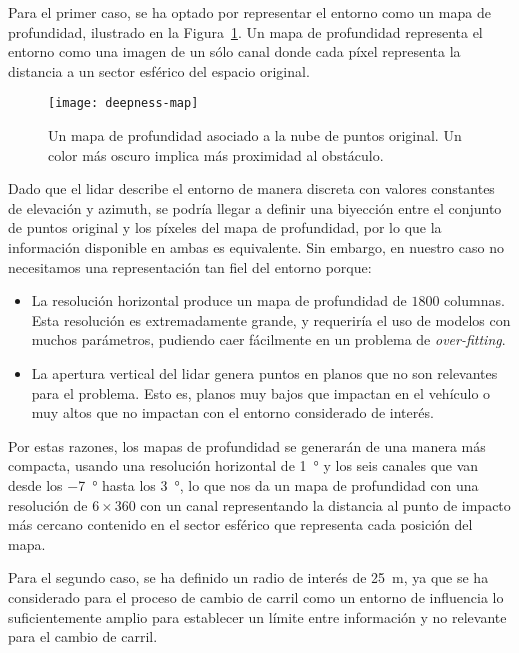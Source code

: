 Para el primer caso, se ha optado por representar el entorno como un mapa de profundidad, ilustrado en la Figura~\ref{fig:deepmap-example}. Un mapa de profundidad representa el entorno como una imagen de un sólo canal donde cada píxel representa la distancia a un sector esférico del espacio original.

\begin{figure}
	\centering
	\texttt{[image: deepness-map]}
	\caption[Mapa de profundidad de ejemplo]{Un mapa de profundidad asociado a la nube de puntos original. Un color más oscuro implica más proximidad al obstáculo.}
	\label{fig:deepmap-example}
\end{figure}

Dado que el \acrshort{lidar} describe el entorno de manera discreta con valores constantes de elevación y azimuth, se podría llegar a definir una biyección entre el conjunto de puntos original y los píxeles del mapa de profundidad, por lo que la información disponible en ambas es equivalente. Sin embargo, en nuestro caso no necesitamos una representación tan fiel del entorno porque:

\begin{itemize}
	\item La resolución horizontal produce un mapa de profundidad de $1800$ columnas. Esta resolución es extremadamente grande, y requeriría el uso de modelos con muchos parámetros, pudiendo caer fácilmente en un problema de \textit{over-fitting}.
	\item La apertura vertical del \acrshort{lidar} genera puntos en planos que no son relevantes para el problema. Esto es, planos muy bajos que impactan en el vehículo o muy altos que no impactan con el entorno considerado de interés.
\end{itemize}

Por estas razones, los mapas de profundidad se generarán de una manera más compacta, usando una resolución horizontal de \SI{1}{\degree} y los seis canales que van desde los \SI{-7}{\degree} hasta los \SI{3}{\degree}, lo que nos da un mapa de profundidad con una resolución de $6 \times 360$ con un canal representando la distancia al punto de impacto más cercano contenido en el sector esférico que representa cada posición del mapa.

Para el segundo caso, se ha definido un radio de interés de \SI{25}{\meter}, ya que se ha considerado para el proceso de cambio de carril como un entorno de influencia lo suficientemente amplio para establecer un límite entre información y no relevante para el cambio de carril.

